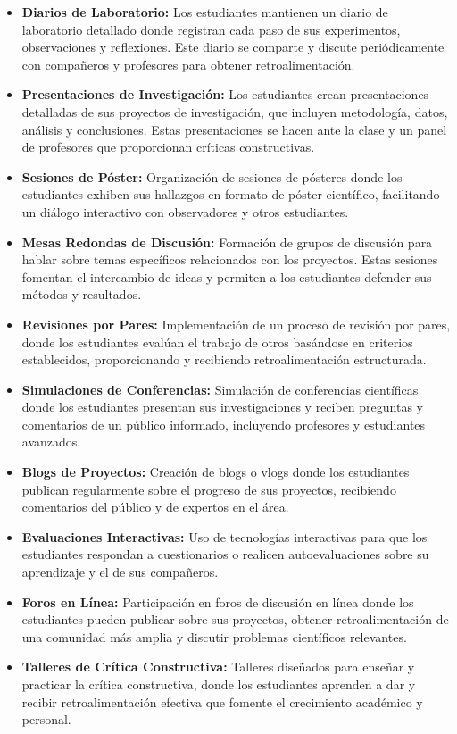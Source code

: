 \begin{itemize}
    \item \textbf{Diarios de Laboratorio:} Los estudiantes mantienen un diario de laboratorio detallado donde registran cada paso de sus experimentos, observaciones y reflexiones. Este diario se comparte y discute periódicamente con compañeros y profesores para obtener retroalimentación.
    \item \textbf{Presentaciones de Investigación:} Los estudiantes crean presentaciones detalladas de sus proyectos de investigación, que incluyen metodología, datos, análisis y conclusiones. Estas presentaciones se hacen ante la clase y un panel de profesores que proporcionan críticas constructivas.
    \item \textbf{Sesiones de Póster:} Organización de sesiones de pósteres donde los estudiantes exhiben sus hallazgos en formato de póster científico, facilitando un diálogo interactivo con observadores y otros estudiantes.
    \item \textbf{Mesas Redondas de Discusión:} Formación de grupos de discusión para hablar sobre temas específicos relacionados con los proyectos. Estas sesiones fomentan el intercambio de ideas y permiten a los estudiantes defender sus métodos y resultados.
    \item \textbf{Revisiones por Pares:} Implementación de un proceso de revisión por pares, donde los estudiantes evalúan el trabajo de otros basándose en criterios establecidos, proporcionando y recibiendo retroalimentación estructurada.
    \item \textbf{Simulaciones de Conferencias:} Simulación de conferencias científicas donde los estudiantes presentan sus investigaciones y reciben preguntas y comentarios de un público informado, incluyendo profesores y estudiantes avanzados.
    \item \textbf{Blogs de Proyectos:} Creación de blogs o vlogs donde los estudiantes publican regularmente sobre el progreso de sus proyectos, recibiendo comentarios del público y de expertos en el área.
    \item \textbf{Evaluaciones Interactivas:} Uso de tecnologías interactivas para que los estudiantes respondan a cuestionarios o realicen autoevaluaciones sobre su aprendizaje y el de sus compañeros.
    \item \textbf{Foros en Línea:} Participación en foros de discusión en línea donde los estudiantes pueden publicar sobre sus proyectos, obtener retroalimentación de una comunidad más amplia y discutir problemas científicos relevantes.
    \item \textbf{Talleres de Crítica Constructiva:} Talleres diseñados para enseñar y practicar la crítica constructiva, donde los estudiantes aprenden a dar y recibir retroalimentación efectiva que fomente el crecimiento académico y personal.
\end{itemize}

